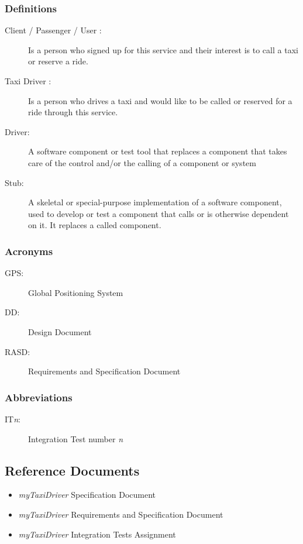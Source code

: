 \documentclass[a4paper]{article}
\begin{document}
\subsubsection{Definitions}

\begin{description}
\item[Client / Passenger / User :] Is a person who signed up for this service and their interest is to call a taxi or reserve  a ride.
\item[Taxi Driver :] Is a person who drives a taxi and would like to be called or reserved for a ride through this service.
\item[Driver:] A software component or test tool that replaces a component that takes care of the control and/or the calling of a component or system
\item[Stub:] A skeletal or special-purpose implementation of a software component, used to develop or test a component that calls or is otherwise dependent on it. It replaces a called component.
\end{description}

\subsubsection{Acronyms}

\begin{description}
\item[GPS:] Global Positioning System
\item[DD:] Design Document
\item[RASD: ] Requirements and Specification Document
\end{description}

\subsubsection{Abbreviations}

\begin{description}
\item[IT\emph{n}:] Integration Test number \emph{n}
\end{description}

\subsection{Reference Documents}
\begin{itemize}
\item \emph{myTaxiDriver} Specification Document
\item \emph{myTaxiDriver} Requirements and Specification Document
\item \emph{myTaxiDriver} Integration Tests Assignment
\end{itemize}
\end{document}
